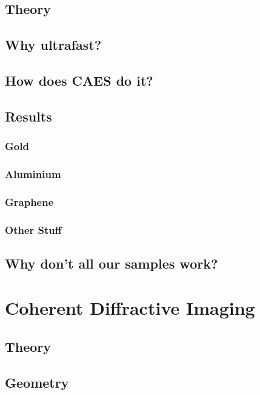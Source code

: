 \section{Theory}

\section{Why ultrafast?}

\section{How does CAES do it?}

\section{Results}

\subsection{Gold}

\subsection{Aluminium}

\subsection{Graphene}

\subsection{Other Stuff}

\section{Why don't all our samples work?}






\chapter{Coherent Diffractive Imaging}

\section{Theory}

\section{Geometry}

